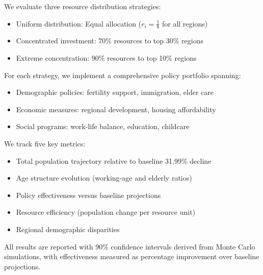 \documentclass{article} %
\begin{document}
We evaluate three resource distribution strategies:
\begin{itemize}
    \item Uniform distribution: Equal allocation ($r_i = \frac{1}{8}$ for all regions)
    \item Concentrated investment: 70\% resources to top 30\% regions
    \item Extreme concentration: 90\% resources to top 10\% regions
\end{itemize}

For each strategy, we implement a comprehensive policy portfolio spanning:
\begin{itemize}
    \item Demographic policies: fertility support, immigration, elder care
    \item Economic measures: regional development, housing affordability
    \item Social programs: work-life balance, education, childcare
\end{itemize}

We track five key metrics:
\begin{itemize}
    \item Total population trajectory relative to baseline 31.99\% decline
    \item Age structure evolution (working-age and elderly ratios)
    \item Policy effectiveness versus baseline projections
    \item Resource efficiency (population change per resource unit)
    \item Regional demographic disparities
\end{itemize}

All results are reported with 90\% confidence intervals derived from Monte Carlo simulations, with effectiveness measured as percentage improvement over baseline projections.
\end{document}
